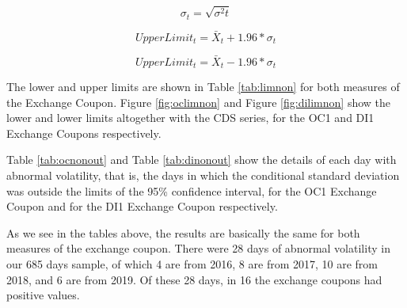 \documentclass[a4paper]{article}
\begin{document}
$$\sigma_t = \sqrt{\sigma^2t}$$

\begin{equation}
\label{eqn:upnp}
UpperLimit_t = \bar{X}_t + 1.96 * \sigma_t
\end{equation}

\begin{equation}
\label{eqn:lonp}
UpperLimit_t = \bar{X}_t - 1.96 * \sigma_t
\end{equation}

\begin{comment}
\begin{equation}
\label{eqn:upnp}
UpperLimitt = \frac{1}{63} \displaystyle\sum_{i=t-22}^{t+22} Volatilityt + 1.96 * \Big(\frac{1}{62} \displaystyle\sum_{i=t-22}^{t+22} (Volatilityt - \frac{1}{63} \displaystyle\sum_{i=t-22}^{t+22} Volatilityt)^2\Big)^{1/2}
\end{equation}

\begin{equation}
\label{eqn:lonp}
LowerLimitt = \frac{1}{63} \displaystyle\sum_{i=t-22}^{t+22} Volatilityt - 1.96 * \Big(\frac{1}{62} \displaystyle\sum_{i=t-22}^{t+22} (Volatilityt - \frac{1}{63} \displaystyle\sum_{i=t-22}^{t+22} Volatilityt)^2\Big)^{1/2}
\end{equation}
\end{comment}


The lower and upper limits are shown in Table \ref{tab:limnon} for both measures of the Exchange Coupon. Figure \ref{fig:oclimnon} and Figure \ref{fig:dilimnon} show the lower and lower limits altogether with the CDS series, for the OC1 and DI1 Exchange Coupons respectively.







Table \ref{tab:ocnonout} and Table \ref{tab:dinonout} show the details of each day with abnormal volatility, that is, the days in which the conditional standard deviation was outside the limits of the 95\% confidence interval, for the OC1 Exchange Coupon and for the DI1 Exchange Coupon respectively.





As we see in the tables above, the results are basically the same for both measures of the exchange coupon. There were 28 days of abnormal volatility in our 685 days sample, of which 4 are from 2016, 8 are from 2017, 10 are from 2018, and 6 are from 2019. Of these 28 days, in 16 the exchange coupons had positive values.
\end{document}
